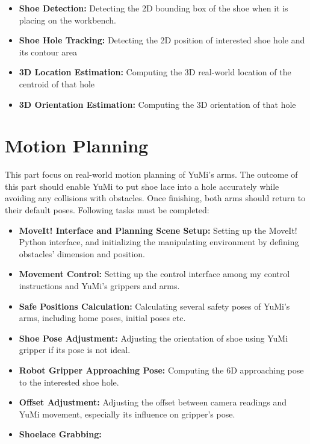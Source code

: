 \begin{itemize}
    \item \textbf{Shoe Detection:} Detecting the 2D bounding box of the shoe when it is placing on the workbench.
    \item \textbf{Shoe Hole Tracking:} Detecting the 2D position of interested shoe hole and its contour area
    \item \textbf{3D Location Estimation:} Computing the 3D real-world location of the centroid of that hole
    \item \textbf{3D Orientation Estimation:} Computing the 3D orientation of that hole
\end{itemize}


\section{Motion Planning}
This part focus on real-world motion planning of YuMi's arms. The outcome of this part should enable YuMi to put shoe lace into a hole accurately while avoiding any collisions with obstacles. Once finishing, both arms should return to their default poses. Following tasks must be completed:

\begin{itemize}
    \item \textbf{MoveIt! Interface and Planning Scene Setup:} Setting up the MoveIt! Python interface, and initializing the manipulating environment by defining obstacles' dimension and position.
    \item \textbf{Movement Control:} Setting up the control interface among my control instructions and YuMi's grippers and arms.
    \item \textbf{Safe Positions Calculation:} Calculating several safety poses of YuMi's arms, including home poses, initial poses etc.
    \item \textbf{Shoe Pose Adjustment:} Adjusting the orientation of shoe using YuMi gripper if its pose is not ideal. 
    \item \textbf{Robot Gripper Approaching Pose:} Computing the 6D approaching pose to the interested shoe hole.
    \item \textbf{Offset Adjustment:} Adjusting the offset between camera readings and YuMi movement, especially its influence on gripper's pose.
    \item \textbf{Shoelace Grabbing:}
\end{itemize}



